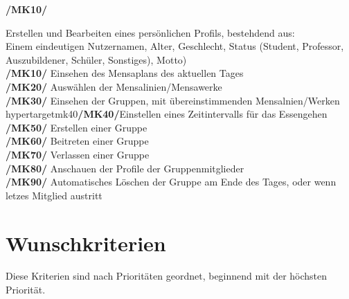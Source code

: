\documentclass[a4paper]{scrreprt}
\begin{document}
\begin{addmargin}[25pt]{0pt} 
\hypertarget{mk10}{\textbf{/MK10/}} Erstellen und Bearbeiten eines persönlichen Profils, bestehdend aus: \\ Einem eindeutigen Nutzernamen, Alter, Geschlecht, Status (Student, Professor, Auszubildener, Schüler, Sonstiges), Motto)\\
\hypertarget{mk10}{\textbf{/MK10/}} Einsehen des Mensaplans des aktuellen Tages\\
\hypertarget{mk20}{\textbf{/MK20/}} Auswählen der Mensalinien/Mensawerke\\
\hypertarget{mk30}{\textbf{/MK30/}} Einsehen der Gruppen, mit übereinstimmenden Mensalnien/Werken\\
hypertarget{mk40}{\textbf{/MK40/}}Einstellen eines Zeitintervalls für das Essengehen \\
\hypertarget{mk50}{\textbf{/MK50/}} Erstellen einer Gruppe\\
\hypertarget{mk60}{\textbf{/MK60/}} Beitreten einer Gruppe\\
\hypertarget{mk70}{\textbf{/MK70/}} Verlassen einer Gruppe\\
\hypertarget{mk80}{\textbf{/MK80/}} Anschauen der Profile der Gruppenmitglieder\\
\hypertarget{mk90}{\textbf{/MK90/}} Automatisches Löschen der Gruppe am Ende des Tages, oder wenn letzes Mitglied austritt\\
\end{addmargin}

\section{Wunschkriterien}
Diese Kriterien sind nach Prioritäten geordnet, beginnend mit der höchsten Priorität.
\end{document}
